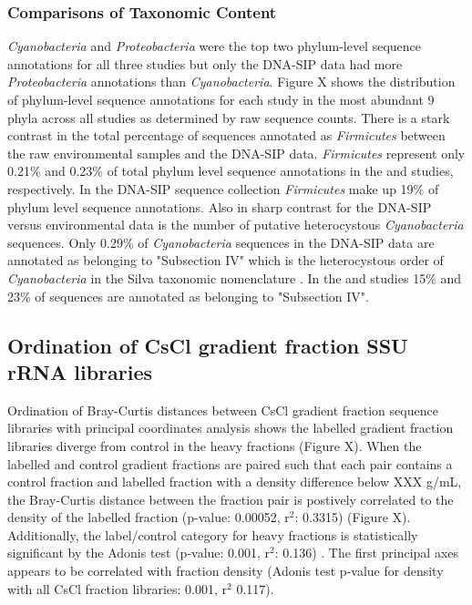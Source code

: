 \subsubsection{Comparisons of Taxonomic Content} 
\textit{Cyanobacteria} and \textit{Proteobacteria} were the top two phylum-level sequence annotations for all three studies but only the DNA-SIP data had more \textit{Proteobacteria} annotations than \textit{Cyanobacteria}. Figure X shows the distribution of phylum-level sequence annotations for each study in the most abundant 9 phyla across all studies as determined by raw sequence counts. There is a stark contrast in the total percentage of sequences annotated as \textit{Firmicutes} between the raw environmental samples and the DNA-SIP data. \textit{Firmicutes} represent only 0.21\% and 0.23\% of total phylum level sequence annotations in the \citet{Steven_2013} and \citet{Garcia_Pichel_2013} studies, respectively. In the DNA-SIP sequence collection \textit{Firmicutes} make up 19\% of phylum level sequence annotations. Also in sharp contrast for the DNA-SIP versus environmental data is the number of putative heterocystous \textit{Cyanobacteria} sequences. Only 0.29\% of \textit{Cyanobacteria} sequences in the DNA-SIP data are annotated as belonging to "Subsection IV" which is the heterocystous order of \textit{Cyanobacteria} in the Silva taxonomic nomenclature \cite{17947321}. In the \citet{Steven_2013} and \citet{Garcia_Pichel_2013} studies 15\% and 23\% of  sequences are annotated as belonging to "Subsection IV".  

\subsection{Ordination of CsCl gradient fraction SSU rRNA libraries}
Ordination of Bray-Curtis \cite{Bray_1957} distances between CsCl gradient fraction sequence libraries with principal coordinates analysis shows the labelled gradient fraction libraries diverge from control in the heavy fractions (Figure X). When the labelled and control gradient fractions are paired such that each pair contains a control fraction and labelled fraction with a density difference below XXX g/mL, the Bray-Curtis distance between the fraction pair is postively correlated to the density of the labelled fraction (p-value: 0.00052, r$^{2}$: 0.3315) (Figure X). Additionally, the label/control category for heavy fractions is statistically significant by the Adonis test (p-value: 0.001, r$^{2}$: 0.136) \cite{Anderson_2001}. The first principal axes appears to be correlated with fraction density (Adonis test p-value for density with all CsCl fraction libraries: 0.001, r$^{2}$ 0.117).

